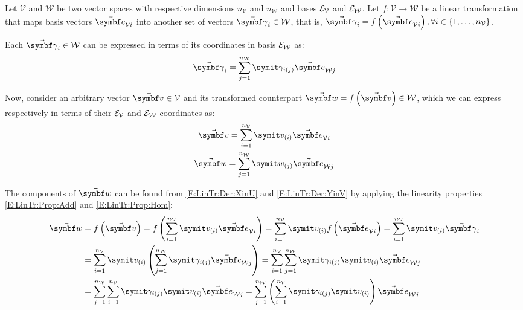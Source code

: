 Let $\mathcal{V}$ and $\mathcal{W}$ be two vector spaces with respective dimensions $n_{\mathcal{V}}$ and $n_{\mathcal{W}}$ and bases $\basis[\mathcal{V}]$ and $\basis[\mathcal{W}]$. Let $f:\mathcal{V}\rightarrow\mathcal{W}$ be a linear transformation that maps basis vectors $\vasub{\bv}{\mathcal{V} i}$ into another set of vectors $\vasub{\gamma}{i}\in\mathcal{W}$, that is,  $\vasub{\gamma}{i}=f\rndp{\vasub{\bv}{\mathcal{V} i}}, \forall i\in\left\{1,\dots, n_{\mathcal{V}}\right\}$.

Each $\vasub{\gamma}{i}\in\mathcal{W}$ can be expressed in terms of its coordinates in basis $\basis[\mathcal{W}]$ as:
\begin{equation} \label{E:LinTr:Der:GammaV}
\vasub{\gamma}{i}=\sum_{j=1}^{n_{\mathcal{W}}} \cmpsub{\gamma}{i}{j} \vasub{\bv}{\mathcal{W} j}
\end{equation}

Now, consider an arbitrary vector $\vabs{v}\in\mathcal{V}$ and its transformed counterpart $\vabs{w}=f\rndp{\vabs{v}}\in\mathcal{W}$, which we can express respectively in terms of their $\basis[\mathcal{V}]$ and $\basis[\mathcal{W}]$ coordinates as:
\begin{gather}
\vabs{v}=\sum_{i=1}^{n_{\mathcal{V}}} \cmp{v}{i} \vasub{\bv}{\mathcal{V} i} \label{E:LinTr:Der:XinU} \\
\vabs{w}=\sum_{j=1}^{n_{\mathcal{W}}}\cmp{w}{j} \vasub{\bv}{\mathcal{W} j} \label{E:LinTr:Der:YinV}
\end{gather}

The components of $\vabs{w}$ can be found from \eqref{E:LinTr:Der:XinU} and \eqref{E:LinTr:Der:YinV} by applying the linearity properties \eqref{E:LinTr:Prop:Add} and \eqref{E:LinTr:Prop:Hom}:
\begin{equation} \label{E:LinTr:Der:YinV2}
\begin{split}
\vabs{w}	&=f\rndp{\vabs{v}}= f\rndp{\sum_{i=1}^{n_{\mathcal{V}}} \cmp{v}{i} \vasub{\bv}{\mathcal{V} i}}=\sum_{i=1}^{n_{\mathcal{V}}}\cmp{v}{i} f \rndp{\vasub{\bv}{\mathcal{V} i}}= \sum_{i=1}^{n_{\mathcal{V}}}\cmp{v}{i} \vasub{\gamma}{i} \\
		&=\sum_{i=1}^{n_{\mathcal{V}}}{\cmp{v}{i} \rndp{\sum_{j=1}^{n_{\mathcal{W}}} \cmpsub{\gamma}{i}{j} \vasub{\bv}{\mathcal{W} j}}} = \sum_{i=1}^{n_{\mathcal{V}}}\sum_{j=1}^{n_{\mathcal{W}}} {\cmpsub{\gamma}{i}{j} \cmp{v}{i} \vasub{\bv}{\mathcal{W} j}} \\
		&=\sum_{j=1}^{n_{\mathcal{W}}}\sum_{i=1}^{n_{\mathcal{V}}} {\cmpsub{\gamma}{i}{j} \cmp{v}{i} \vasub{\bv}{\mathcal{W} j}} =\sum_{j=1}^{n_{\mathcal{W}}} \rndp{\sum_{i=1}^{n_{\mathcal{V}}} {\cmpsub{\gamma}{i}{j} \cmp{v}{i}}} \vasub{\bv}{\mathcal{W} j}
\end{split}
\end{equation}

